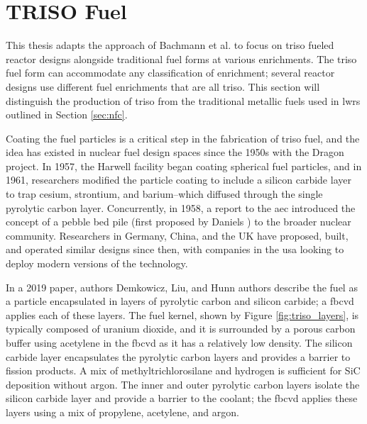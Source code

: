 \section{TRISO Fuel}
\label{sec:triso_fuel}

This thesis adapts the approach of Bachmann et al.
\cite{bachmann_enrichment_2021} to focus on \gls{triso} fueled reactor designs
alongside traditional fuel forms at various enrichments. The \gls{triso} fuel form can accommodate any classification of enrichment; several reactor designs use different fuel enrichments that are all \gls{triso}. This section will distinguish the production of \gls{triso} from the traditional metallic fuels used in \glspl{lwr} outlined in Section \ref{sec:nfc}.

Coating the fuel particles is a critical step in the fabrication of \gls{triso}
fuel, and the idea has existed in nuclear fuel design spaces since the 1950s
\cite{price_dragon_2012} with the Dragon project. In 1957, the Harwell facility
began coating spherical fuel particles, and in 1961, researchers modified the
particle coating to include a silicon carbide layer to trap cesium, strontium,
and barium--which diffused through the single pyrolytic carbon layer.
Concurrently, in 1958, a report to the \gls{aec} introduced the concept of a
pebble bed pile (first proposed by Daniels
\cite{f_b_daniels_suggestions_1944}) to the broader nuclear community.
Researchers in Germany, China, and the UK have proposed, built, and operated
similar designs since then, with companies in the \gls{usa} looking to deploy
modern versions of the technology.

In a 2019 paper, authors Demkowicz, Liu, and Hunn \cite{particle_review_2019}
authors describe the fuel as a particle encapsulated in layers of pyrolytic
carbon and silicon carbide; a \gls{fbcvd} applies each of these layers. The
fuel kernel, shown by Figure \ref{fig:triso_layers}, is typically composed of
uranium dioxide, and it is surrounded by a porous carbon buffer using acetylene
in the \gls{fbcvd} as it has a relatively low density. The silicon carbide
layer encapsulates the pyrolytic carbon layers and provides a barrier to
fission products. A mix of methyltrichlorosilane and hydrogen is sufficient for
SiC deposition without argon. The inner and outer pyrolytic carbon layers
isolate the silicon carbide layer and provide a barrier to the coolant; the
\gls{fbcvd} applies these layers using a mix of propylene, acetylene, and argon.

